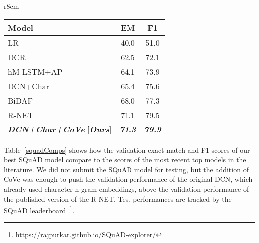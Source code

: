 \begin{wraptable}{r}{8cm}
    \vspace{-3.5mm}
  \centering
  \begin{tabular}{lcc}
    \toprule
Model & EM  & F1 \\
\midrule
LR~\citep{rajpurkar2016squad} & 40.0 & 51.0 \\
DCR~\citep{yu2017end} & 62.5 & 72.1  \\
hM-LSTM+AP~\citep{wang2017machine} & 64.1 & 73.9 \\
DCN+Char~\citep{Xiong2017} & 65.4 & 75.6 \\
BiDAF~\citep{Seo2017BidirectionalAF} & 68.0 & 77.3 \\
R-NET~\citep{Wang2017} & 71.1 & 79.5 \\
{\it \textbf{DCN+Char+CoVe} } [{\it \textbf{Ours}}] &{\it \textbf{71.3} }&{\it \textbf{79.9} }\\
\bottomrule
  \end{tabular}
      \caption{Exact match and F1 validation scores for single-model question answering.
      }
  \label{squadComps}
    \vspace{-8mm}
\end{wraptable}

Table~\ref{squadComps} shows how the validation exact match and F1 scores of our best SQuAD model compare to the scores of the most recent top models in the literature. 
We did not submit the SQuAD model for testing, 
but the addition of CoVe was enough to push the validation performance of the original DCN,
which already used character n-gram embeddings,
above the validation performance of the published version of the R-NET. 
Test performances are tracked by the SQuAD leaderboard~\footnote{\url{https://rajpurkar.github.io/SQuAD-explorer/}}.

